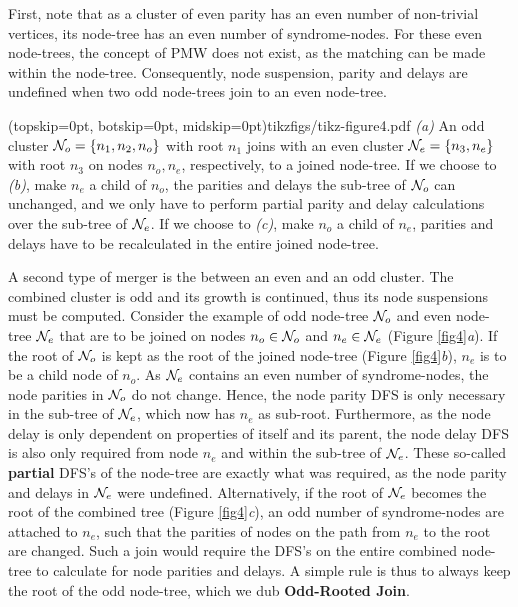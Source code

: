 First, note that as a cluster of even parity has an even number of non-trivial vertices, its node-tree has an even number of syndrome-nodes. For these even node-trees, the concept of PMW does not exist, as the matching can be made within the node-tree. Consequently, node suspension, parity and delays are undefined when two odd node-trees join to an even node-tree. 

\Figure[hbt](topskip=0pt, botskip=0pt, midskip=0pt){tikzfigs/tikz-figure4.pdf}{
    \emph{(a)} An odd cluster $\mathcal{N}_o=\{n_1, n_2, n_o\}$ with root $n_1$ joins with an even cluster $\mathcal{N}_e=\{n_3, n_e\}$ with root $n_3$ on nodes $n_o, n_e$, respectively, to a joined node-tree. If we choose to \emph{(b)}, make $n_e$ a child of $n_o$, the parities and delays the sub-tree of $\mathcal{N}_o$ can unchanged, and we only have to perform partial parity and delay calculations over the sub-tree of $\mathcal{N}_e$. If we choose to \emph{(c)}, make $n_o$ a child of $n_e$, parities and delays have to be recalculated in the entire joined node-tree. \label{fig4}}

A second type of merger is the between an even and an odd cluster. The combined cluster is odd and its growth is continued, thus its node suspensions must be computed. Consider the example of odd node-tree $\mathcal{N}_o$ and even node-tree $\mathcal{N}_e$ that are to be joined on nodes $n_o\in \mathcal{N}_o$ and $n_e \in \mathcal{N}_e$ (Figure \ref{fig4}\emph{a}). If the root of $\mathcal{N}_o$ is kept as the root of the joined node-tree (Figure \ref{fig4}\emph{b}), $n_e$ is to be a child node of $n_o$. As $\mathcal{N}_e$ contains an even number of syndrome-nodes, the node parities in $\mathcal{N}_o$ do not change. Hence, the node parity DFS is only necessary in the sub-tree of $\mathcal{N}_e$, which now has $n_e$ as sub-root. Furthermore, as the node delay is only dependent on properties of itself and its parent, the node delay DFS is also only required from node $n_e$ and within the sub-tree of $\mathcal{N}_e$. These so-called \textbf{partial} DFS's of the node-tree are exactly what was required, as the node parity and delays in $\mathcal{N}_e$ were undefined. Alternatively, if the root of $\mathcal{N}_e$ becomes the root of the combined tree (Figure \ref{fig4}\emph{c}), an odd number of syndrome-nodes are attached to $n_e$, such that the parities of nodes on the path from $n_e$ to the root are changed. Such a join would require the DFS's on the entire combined node-tree to calculate for node parities and delays. A simple rule is thus to always keep the root of the odd node-tree, which we dub \textbf{Odd-Rooted Join}.

